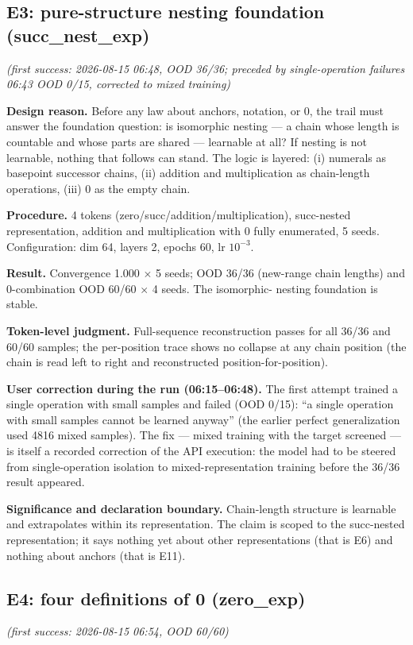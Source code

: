 \documentclass[sigplan,10pt,anonymous,review]{acmart}
\begin{document}
\subsection{E3: pure-structure nesting foundation (succ\_nest\_exp)}\hfill\textit{(first success: 2026-08-15 06:48, OOD 36/36; preceded by single-operation failures 06:43 OOD 0/15, corrected to mixed training)}

\textbf{Design reason.} Before any law about anchors, notation, or 0, the
trail must answer the foundation question: is isomorphic nesting --- a chain
whose length is countable and whose parts are shared --- learnable at all?
If nesting is not learnable, nothing that follows can stand. The logic is
layered: (i) numerals as basepoint successor chains, (ii) addition and
multiplication as chain-length operations, (iii) 0 as the empty chain.

\textbf{Procedure.} 4 tokens (zero/succ/addition/multiplication), succ-nested
representation, addition and multiplication with 0 fully enumerated, 5 seeds.
Configuration: dim 64, layers 2, epochs 60, lr $10^{-3}$.

\textbf{Result.} Convergence 1.000 $\times$ 5 seeds; OOD 36/36 (new-range
chain lengths) and 0-combination OOD 60/60 $\times$ 4 seeds. The isomorphic-
nesting foundation is stable.

\textbf{Token-level judgment.} Full-sequence reconstruction passes for all
36/36 and 60/60 samples; the per-position trace shows no collapse at any
chain position (the chain is read left to right and reconstructed
position-for-position).

\textbf{User correction during the run (06:15--06:48).} The first attempt
trained a single operation with small samples and failed (OOD 0/15): ``a
single operation with small samples cannot be learned anyway'' (the earlier
perfect generalization used 4816 mixed samples). The fix --- mixed training
with the target screened --- is itself a recorded correction of the API
execution: the model had to be steered from single-operation isolation to
mixed-representation training before the 36/36 result appeared.

\textbf{Significance and declaration boundary.} Chain-length structure is
learnable and extrapolates within its representation. The claim is scoped
to the succ-nested representation; it says nothing yet about other
representations (that is E6) and nothing about anchors (that is E11).

\subsection{E4: four definitions of 0 (zero\_exp)}\hfill\textit{(first success: 2026-08-15 06:54, OOD 60/60)}
\end{document}
